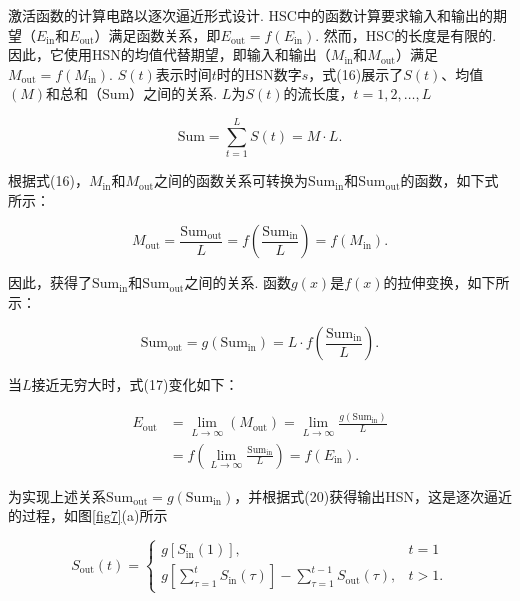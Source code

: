 \documentclass{solitairemiya-art}
\begin{document}
激活函数的计算电路以逐次逼近形式设计. HSC中的函数计算要求输入和输出的期望（$E_{\mathrm{in}}$和$E_{\mathrm{out}}$）满足函数关系，即$E_{\mathrm{out}} = f(E_{\mathrm{in}})$. 然而，HSC的长度是有限的. 因此，它使用HSN的均值代替期望，即输入和输出（$M_{\mathrm{in}}$和$M_{\mathrm{out}}$）满足$M_{\mathrm{out}} = f(M_{\mathrm{in}})$. $S(t)$表示时间$t$时的HSN数字$s$，式(16)展示了$S(t)$、均值$(M)$和总和（Sum）之间的关系. $L$为$S(t)$的流长度，$t = 1, 2, \ldots, L$

\begin{equation}
\mathrm{Sum} = \sum_{t=1}^{L} S(t) = M \cdot L.
\end{equation}

根据式(16)，$M_{\mathrm{in}}$和$M_{\mathrm{out}}$之间的函数关系可转换为$\mathrm{Sum}_{\mathrm{in}}$和$\mathrm{Sum}_{\mathrm{out}}$的函数，如下式所示：

\begin{equation}
M_{\mathrm{out}} = \frac{\mathrm{Sum}_{\mathrm{out}}}{L} = f\left(\frac{\mathrm{Sum}_{\mathrm{in}}}{L}\right) = f(M_{\mathrm{in}}).
\end{equation}

因此，获得了$\mathrm{Sum}_{\mathrm{in}}$和$\mathrm{Sum}_{\mathrm{out}}$之间的关系. 函数$g(x)$是$f(x)$的拉伸变换，如下所示：

\begin{equation}
\mathrm{Sum}_{\mathrm{out}} = g(\mathrm{Sum}_{\mathrm{in}}) = L \cdot f\left(\frac{\mathrm{Sum}_{\mathrm{in}}}{L}\right).
\end{equation}

当$L$接近无穷大时，式(17)变化如下：

\begin{equation}
\begin{aligned}
E_{\mathrm{out}} &= \lim_{L \to \infty}(M_{\mathrm{out}}) = \lim_{L \to \infty} \frac{g(\mathrm{Sum}_{\mathrm{in}})}{L} \\
&= f\left(\lim_{L \to \infty} \frac{\mathrm{Sum}_{\mathrm{in}}}{L}\right) = f(E_{\mathrm{in}}).
\end{aligned}
\end{equation}

为实现上述关系$\mathrm{Sum}_{\mathrm{out}} = g(\mathrm{Sum}_{\mathrm{in}})$，并根据式(20)获得输出HSN，这是逐次逼近的过程，如图\ref{fig7}(a)所示

\begin{equation}
S_{\mathrm{out}}(t) = \left\{ \begin{array}{ll}
g[S_{\mathrm{in}}(1)], & t = 1 \\
g\left[\sum_{\tau=1}^{t} S_{\mathrm{in}}(\tau)\right] - \sum_{\tau=1}^{t-1} S_{\mathrm{out}}(\tau), & t > 1.
\end{array} \right.
\end{equation}
\end{document}
